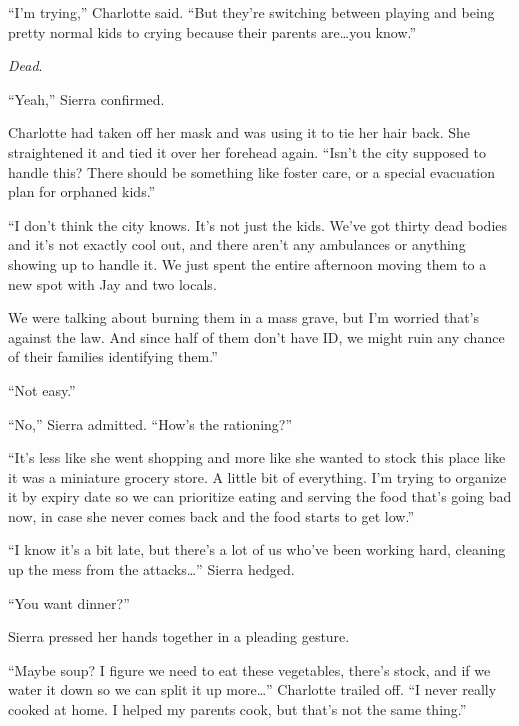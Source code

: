 ``I'm trying,'' Charlotte said.  ``But they're switching between playing and being pretty normal kids to crying because their parents are\ldots you know.''



\emph{Dead}.



``Yeah,'' Sierra confirmed.



Charlotte had taken off her mask and was using it to tie her hair back.  She straightened it and tied it over her forehead again.  ``Isn't the city supposed to handle this?  There should be something like foster care, or a special evacuation plan for orphaned kids.''



``I don't think the city knows.  It's not just the kids.  We've got thirty dead bodies and it's not exactly cool out, and there aren't any ambulances or anything showing up to handle it. We just spent the entire afternoon moving them to a new spot with Jay and two locals.



We were talking about burning them in a mass grave, but I'm worried that's against the law.  And since half of them don't have ID, we might ruin any chance of their families identifying them.''



``Not easy.''



``No,'' Sierra admitted. ``How's the rationing?''



``It's less like she went shopping and more like she wanted to stock this place like it was a miniature grocery store.  A little bit of everything.  I'm trying to organize it by expiry date so we can prioritize eating and serving the food that's going bad now, in case she never comes back and the food starts to get low.''



``I know it's a bit late, but there's a lot of us who've been working hard, cleaning up the mess from the attacks\ldots''  Sierra hedged.



``You want dinner?''



Sierra pressed her hands together in a pleading gesture.



``Maybe soup?  I figure we need to eat these vegetables, there's stock, and if we water it down so we can split it up more\ldots''  Charlotte trailed off.  ``I never really cooked at home.  I helped my parents cook, but that's not the same thing.''



